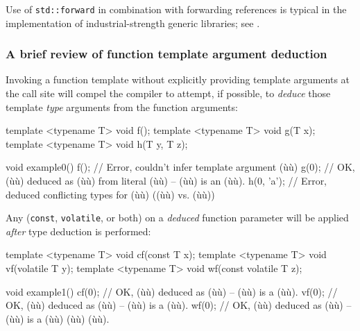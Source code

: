 \noindent Use of \lstinline!std::forward! in combination with forwarding references
is typical in the implementation of industrial-strength generic
libraries; see .

\subsubsection[A brief review of function template argument deduction]{A brief review of function template argument deduction}\label{a-brief-review-of-function-template-argument-deduction}

Invoking a function template without explicitly providing template
arguments at the call site will compel the compiler to attempt, if
possible, to \emph{deduce} those template \emph{type} arguments from the
function arguments:

\begin{emcppslisting}
template <typename T> void f();
template <typename T> void g(T x);
template <typename T> void h(T y, T z);

void example0()
{
    f();        // Error, couldn't infer template argument (ù{}ù)
    g(0);       // OK, (ù{}ù) deduced as (ù{}ù) from literal (ù{}ù) -- (ù{}ù) is an (ù{}ù).
    h(0, 'a');  // Error, deduced conflicting types for (ù{}ù) ((ù{}ù) vs. (ù{}ù))
}
\end{emcppslisting}

\noindent Any  (\lstinline!const!, \lstinline!volatile!, or both)
on a \emph{deduced} function parameter will be applied \emph{after} type
deduction is performed:

\begin{emcppslisting}
template <typename T> void cf(const T x);
template <typename T> void vf(volatile T y);
template <typename T> void wf(const volatile T z);

void example1()
{
    cf(0);  // OK, (ù{}ù) deduced as (ù{}ù) -- (ù{}ù) is a (ù{}ù).
    vf(0);  // OK, (ù{}ù) deduced as (ù{}ù) -- (ù{}ù) is a (ù{}ù).
    wf(0);  // OK, (ù{}ù) deduced as (ù{}ù) -- (ù{}ù) is a (ù{}ù) (ù{}ù) (ù{}ù).
}
\end{emcppslisting}


